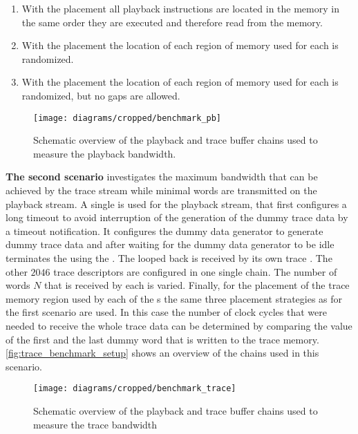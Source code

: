 \begin{enumerate}
    \item With the \linear{} placement all playback instructions are located in the \DDR{} memory in the same order they are executed and therefore read from the memory.
    \item With the \random{} placement the location of each region of memory used for each \descriptor{} is randomized.
    \item With the \randomDense{} placement the location of each region of memory used for each \descriptor{} is randomized, but no gaps are allowed.
\end{enumerate}

\begin{figure}[htbp]
\centerline{\texttt{[image: diagrams/cropped/benchmark\_pb]}}
\caption{Schematic overview of the playback and trace buffer chains used to measure the playback bandwidth.}\label{fig:pb_benchmark_setup}
\end{figure}

\textbf{The second scenario} investigates the maximum bandwidth that can be achieved by the trace stream while minimal words are transmitted on the playback stream. A single \descriptor{} is used for the playback stream, that first configures a long timeout to avoid interruption of the generation of the dummy trace data by a timeout notification. It configures the dummy data generator to generate dummy trace data and after waiting for the dummy data generator to be idle terminates the \PlaybackProgram{} using the \haltInstr{}. The looped back \haltInstr{} is received by its own trace \descriptor{}. The other $\num{2046}$ trace descriptors are configured in one single \descriptor{} chain. The number of words $N$ that is received by each \descriptor{} is varied. Finally, for the placement of the trace memory region used by each of the \descriptor{}s the same three placement strategies as for the first scenario are used. In this case the number of clock cycles that were needed to receive the whole trace data can be determined by comparing the \systime{} value of the first and the last dummy word that is written to the trace memory. \autoref{fig:trace_benchmark_setup} shows an overview of the \descriptor{} chains used in this scenario.

\begin{figure}[htbp]
\centerline{\texttt{[image: diagrams/cropped/benchmark\_trace]}}
\caption{Schematic overview of the playback and trace buffer chains used to measure the trace bandwidth}\label{fig:trace_benchmark_setup}
\end{figure}

